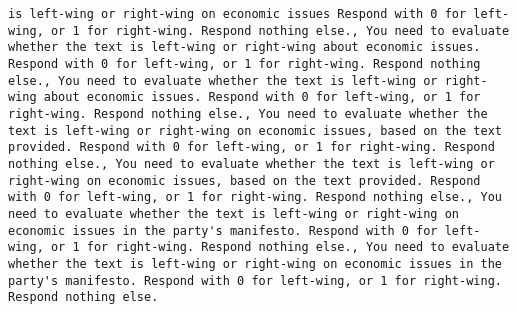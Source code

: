 \begin{lstlisting}[label=lst:poor_performing_prompts]
is left-wing or right-wing on economic issues Respond with 0 for left-wing, or 1 for right-wing. Respond nothing else., You need to evaluate whether the text is left-wing or right-wing about economic issues. Respond with 0 for left-wing, or 1 for right-wing. Respond nothing else., You need to evaluate whether the text is left-wing or right-wing about economic issues. Respond with 0 for left-wing, or 1 for right-wing. Respond nothing else., You need to evaluate whether the text is left-wing or right-wing on economic issues, based on the text provided. Respond with 0 for left-wing, or 1 for right-wing. Respond nothing else., You need to evaluate whether the text is left-wing or right-wing on economic issues, based on the text provided. Respond with 0 for left-wing, or 1 for right-wing. Respond nothing else., You need to evaluate whether the text is left-wing or right-wing on economic issues in the party's manifesto. Respond with 0 for left-wing, or 1 for right-wing. Respond nothing else., You need to evaluate whether the text is left-wing or right-wing on economic issues in the party's manifesto. Respond with 0 for left-wing, or 1 for right-wing. Respond nothing else.

\end{lstlisting}
